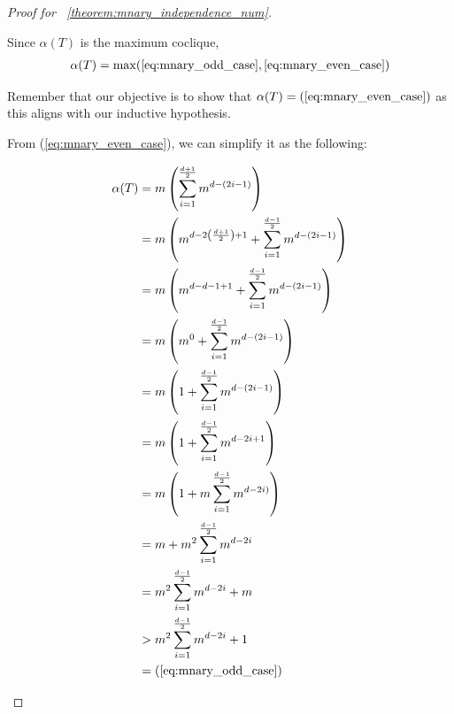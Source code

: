 \documentclass{amsart}
\theoremstyle{definition}
\begin{document}
\begin{proof}[Proof for ~\ref{theorem:mnary_independence_num}]
\begin{caseof}
\begin{subcaseof}
		\end{subcaseof}

		Since $\alpha(T)$ is the maximum coclique,
		\begin{align*}
			\alpha(T) = \max(\ref{eq:mnary_odd_case}, \ref{eq:mnary_even_case})
		\end{align*}

		Remember that our objective is to show that $\alpha(T) = (\ref{eq:mnary_even_case})$ as this aligns with our inductive hypothesis.

		From (\ref{eq:mnary_even_case}), we can simplify it as the following:

		\begin{align*}
			\alpha(T) & = m\left(\displaystyle\sum_{i = 1}^{\frac{d + 1}{2}}m^{d - (2i - 1)}\right)                                             \\
			          & = m\left(m^{d - 2\left(\frac{d + 1}{2}\right) + 1} + \displaystyle\sum_{i = 1}^{\frac{d - 1}{2}}m^{d - (2i - 1)}\right) \\
			          & = m\left(m^{d - d - 1 + 1} + \displaystyle\sum_{i = 1}^{\frac{d - 1}{2}}m^{d - (2i - 1)}\right)                         \\
			          & = m\left(m^0 + \displaystyle\sum_{i = 1}^{\frac{d - 1}{2}}m^{d - (2i - 1)}\right)                                       \\
			          & = m\left(1 + \displaystyle\sum_{i = 1}^{\frac{d - 1}{2}}m^{d - (2i - 1)}\right)                                         \\
			          & = m\left(1 + \displaystyle\sum_{i = 1}^{\frac{d - 1}{2}}m^{d - 2i + 1}\right)                                           \\
			          & = m\left(1 + m\displaystyle\sum_{i = 1}^{\frac{d - 1}{2}}m^{d - 2i)}\right)                                             \\
			          & = m + m^2\displaystyle\sum_{i = 1}^{\frac{d - 1}{2}}m^{d - 2i}                                                          \\
			          & = m^2\displaystyle\sum_{i = 1}^{\frac{d - 1}{2}}m^{d - 2i} + m                                                          \\
			          & > m^2\displaystyle\sum_{i = 1}^{\frac{d - 1}{2}}m^{d - 2i} + 1                                                          \\
			          & = (\ref{eq:mnary_odd_case})
		\end{align*}


\end{caseof}
\end{proof}
\end{document}
